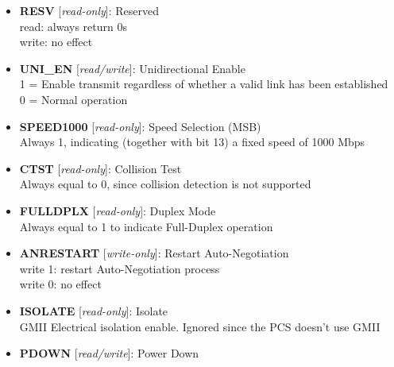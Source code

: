 \begin{itemize}
\item \begin{small}
{\bf 
RESV
} [\emph{read-only}]: Reserved
\\
read: always return 0s \\                        write: no effect
\end{small}
\item \begin{small}
{\bf 
UNI\_EN
} [\emph{read/write}]: Unidirectional Enable
\\
1 = Enable transmit regardless of whether a valid link has been established\\				                0 = Normal operation
\end{small}
\item \begin{small}
{\bf 
SPEED1000
} [\emph{read-only}]: Speed Selection (MSB)
\\
Always 1, indicating (together with bit 13) a fixed speed of 1000 Mbps
\end{small}
\item \begin{small}
{\bf 
CTST
} [\emph{read-only}]: Collision Test
\\
Always equal to 0, since collision detection is not supported
\end{small}
\item \begin{small}
{\bf 
FULLDPLX
} [\emph{read-only}]: Duplex Mode
\\
Always equal to 1 to indicate Full-Duplex operation
\end{small}
\item \begin{small}
{\bf 
ANRESTART
} [\emph{write-only}]: Restart Auto-Negotiation
\\
write 1: restart Auto-Negotiation process\\				                write 0: no effect
\end{small}
\item \begin{small}
{\bf 
ISOLATE
} [\emph{read-only}]: Isolate
\\
GMII Electrical isolation enable. Ignored since the PCS doesn't use GMII
\end{small}
\item \begin{small}
{\bf 
PDOWN
} [\emph{read/write}]: Power Down
\\

\end{small}
\end{itemize}
